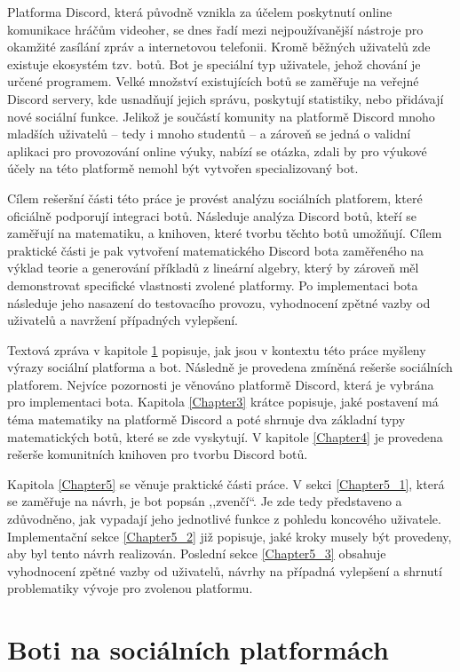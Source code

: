 \documentclass[FM]{tulthesis}
\begin{document}
	Platforma Discord, která původně vznikla za účelem poskytnutí online komunikace hráčům videoher, se dnes řadí mezi nejpoužívanější nástroje pro okamžité zasílání zpráv a internetovou telefonii. Kromě běžných uživatelů zde existuje ekosystém tzv. botů. Bot je speciální typ uživatele, jehož chování je určené programem. Velké množství existujících botů se zaměřuje na veřejné Discord servery, kde usnadňují jejich správu, poskytují statistiky, nebo přidávají nové sociální funkce. Jelikož je součástí komunity na platformě \mbox{Discord} mnoho mladších uživatelů – tedy i mnoho studentů – a zároveň se jedná o validní aplikaci pro provozování online výuky, nabízí se otázka, zdali by pro výukové účely na této platformě nemohl být vytvořen specializovaný bot.	
	
	Cílem rešeršní části této práce je provést analýzu sociálních platforem, které oficiálně podporují integraci botů. Následuje analýza Discord botů, kteří se zaměřují na matematiku, a knihoven, které tvorbu těchto botů umožňují. Cílem praktické části je pak vytvoření matematického Discord bota zaměřeného na výklad teorie a generování příkladů z lineární algebry, který by zároveň měl demonstrovat specifické vlastnosti zvolené platformy. Po implementaci bota následuje jeho nasazení do testovacího provozu, vyhodnocení zpětné vazby od uživatelů a navržení případných vylepšení.
	
	Textová zpráva v kapitole \ref{Chapter2} popisuje, jak jsou v kontextu této práce myšleny výrazy sociální platforma a bot. Následně je provedena zmíněná rešerše sociálních platforem. Nejvíce pozornosti je věnováno platformě Discord, která je vybrána pro implementaci bota. Kapitola \ref{Chapter3} krátce popisuje, jaké postavení má téma matematiky na platformě Discord a poté shrnuje dva základní typy matematických botů, které se zde vyskytují. V kapitole \ref{Chapter4} je provedena rešerše komunitních knihoven pro tvorbu Discord botů.
	
	Kapitola \ref{Chapter5} se věnuje praktické části práce. V sekci \ref{Chapter5_1}, která se zaměřuje na návrh, je bot popsán ,,zvenčí``. Je zde tedy představeno a zdůvodněno, jak vypadají jeho jednotlivé funkce z pohledu koncového uživatele. Implementační sekce \ref{Chapter5_2} již popisuje, jaké kroky musely být provedeny, aby byl tento návrh realizován. Poslední sekce \ref{Chapter5_3} obsahuje vyhodnocení zpětné vazby od uživatelů, návrhy na případná vylepšení a shrnutí problematiky vývoje pro zvolenou platformu.
	
	\chapter{Boti na sociálních platformách}\label{Chapter2}
	
\end{document}

